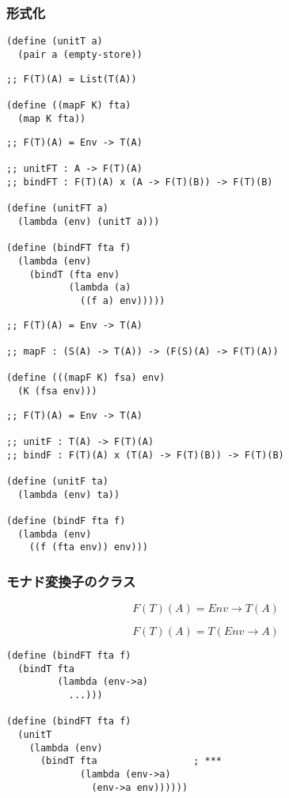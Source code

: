 \documentclass[11pt, oneside]{jsarticle}   	%
\begin{document}
\subsubsection{  形式化 }
\begin{lstlisting}
(define (unitT a)
  (pair a (empty-store))
\end{lstlisting}

\begin{lstlisting}
;; F(T)(A) = List(T(A))

(define ((mapF K) fta)
  (map K fta))
\end{lstlisting}

\begin{lstlisting}
;; F(T)(A) = Env -> T(A)

;; unitFT : A -> F(T)(A)
;; bindFT : F(T)(A) x (A -> F(T)(B)) -> F(T)(B)

(define (unitFT a)
  (lambda (env) (unitT a)))

(define (bindFT fta f)
  (lambda (env)
    (bindT (fta env)
           (lambda (a)
             ((f a) env)))))
\end{lstlisting}

\begin{lstlisting}  
;; F(T)(A) = Env -> T(A)

;; mapF : (S(A) -> T(A)) -> (F(S)(A) -> F(T)(A))

(define (((mapF K) fsa) env)
  (K (fsa env)))
\end{lstlisting}

\begin{lstlisting}
;; F(T)(A) = Env -> T(A)

;; unitF : T(A) -> F(T)(A)
;; bindF : F(T)(A) x (T(A) -> F(T)(B)) -> F(T)(B)

(define (unitF ta)
  (lambda (env) ta))

(define (bindF fta f)
  (lambda (env)
    ((f (fta env)) env)))
\end{lstlisting}

\subsubsection{ モナド変換子のクラス }
$$
F(T)(A) = Env \rightarrow T(A)
$$

$$
F(T)(A) = T(Env \rightarrow A)
$$

\begin{lstlisting}
(define (bindFT fta f)
  (bindT fta
         (lambda (env->a)
           ...)))

(define (bindFT fta f)
  (unitT
    (lambda (env)
      (bindT fta                 ; ***
             (lambda (env->a)
               (env->a env))))))
\end{lstlisting}
\end{document}
